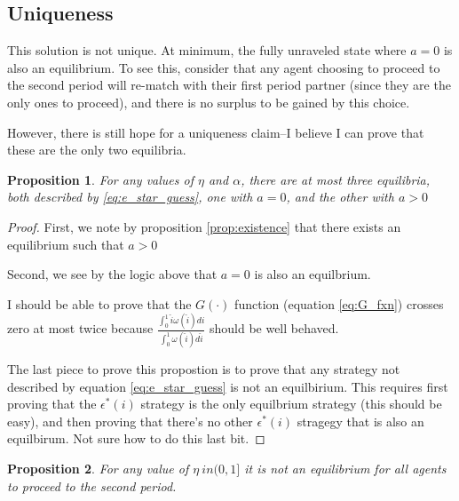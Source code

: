 \documentclass[WP]{AEA}
\newtheorem{prop}{Proposition}
\begin{document}
\subsection{Uniqueness}

This solution is not unique.  At minimum, the fully unraveled state where $a= 0$ is also an equilibrium.  To see this, consider that any agent choosing to proceed to the second period will re-match with their first period partner (since they are the only ones to proceed), and there is no surplus to be gained by this choice.

However, there is still hope for a uniqueness claim--I believe I can prove that these are the only two equilibria.

\begin{prop}
		For any values of $\eta$ and $\alpha$, there are at most three equilibria, both described by \ref{eq:e_star_guess}, one with $a = 0$, and the other with $a > 0$
\end{prop}
\begin{proof}
	First, we note by proposition \ref{prop:existence} that there exists an equilibrium such that $a > 0$
	
	Second, we see by the logic above that $a = 0$ is also an equilbrium.
	
	I should be able to prove that the $G(\cdot)$ function (equation \ref{eq:G_fxn}) crosses zero at most twice because $ \frac{\int_0^1 \hat{i} \omega(\hat{i}) di}{\int_0^1  \omega(\hat{i}) d\hat{i}}$ should be well behaved.
	
	The last piece to prove this propostion is to prove that any strategy not described by equation \ref{eq:e_star_guess} is not an equilbirium.  This requires first proving that the $\epsilon^*(i)$ strategy is the only equilbrium strategy (this should be easy), and then proving that there's no  other  $\epsilon^*(i)$ stragegy that is also an equilbirum. Not sure how to do this last bit.
	 
\end{proof}	

\begin{prop}
	For any value of $\eta \ in (0, 1]$ it is not an equilibrium for all agents to proceed to the second period. 
\end{prop}
\end{document}
